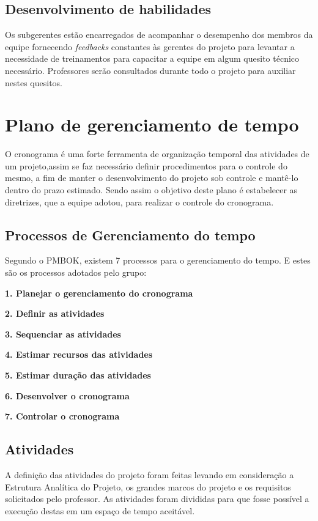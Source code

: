 \subsection{Desenvolvimento de habilidades}

Os subgerentes estão encarregados de acompanhar o desempenho dos membros da equipe fornecendo \textit{feedbacks} constantes às gerentes do projeto para levantar a necessidade de treinamentos para capacitar a equipe em algum quesito técnico necessário. Professores serão consultados durante todo o projeto para auxiliar nestes quesitos.




\section{Plano de gerenciamento de tempo}

O cronograma é uma forte ferramenta de organização temporal das atividades de um projeto,assim se faz necessário definir procedimentos para o controle do mesmo, a fim de manter o desenvolvimento do projeto sob controle e mantê-lo dentro do prazo estimado. Sendo assim o objetivo deste plano é estabelecer as diretrizes, que a equipe adotou, para realizar o controle do cronograma.


\subsection{Processos de Gerenciamento do tempo}
Segundo o PMBOK, existem 7 processos para o gerenciamento do tempo. E estes são os processos adotados pelo grupo:

\textbf{1. Planejar o gerenciamento do cronograma}

\textbf{2. Definir as atividades}

\textbf{3. Sequenciar as atividades}

\textbf{4. Estimar recursos das atividades}

\textbf{5. Estimar duração das atividades}

\textbf{6. Desenvolver o cronograma}

\textbf{7. Controlar o cronograma}

\subsection{Atividades}

A definição das atividades do projeto foram feitas levando em consideração a Estrutura Analítica do Projeto, os grandes marcos do projeto e os requisitos solicitados pelo professor. As atividades foram divididas para que fosse possível a execução destas em um espaço de tempo aceitável. 

